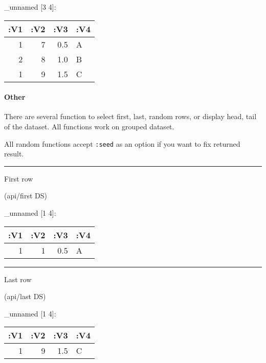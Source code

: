 \documentclass[]{article}
\newenvironment{Shaded}{\begin{snugshade}}{\end{snugshade}}
\newcommand{\NormalTok}[1]{#1}
\let\oldparagraph\paragraph
\renewcommand{\paragraph}[1]{\oldparagraph{#1}\mbox{}}
\begin{document}
\_unnamed {[}3 4{]}:

\begin{longtable}[]{@{}rrrl@{}}
\toprule
:V1 & :V2 & :V3 & :V4\tabularnewline
\midrule
\endhead
1 & 7 & 0.5 & A\tabularnewline
2 & 8 & 1.0 & B\tabularnewline
1 & 9 & 1.5 & C\tabularnewline
\bottomrule
\end{longtable}

\paragraph{Other}\label{other}

There are several function to select first, last, random rows, or
display head, tail of the dataset. All functions work on grouped
dataset.

All random functions accept \texttt{:seed} as an option if you want to
fix returned result.

\begin{center}\rule{0.5\linewidth}{0.5pt}\end{center}

First row

\begin{Shaded}
\begin{Highlighting}[]
\NormalTok{(api/first DS)}
\end{Highlighting}
\end{Shaded}

\_unnamed {[}1 4{]}:

\begin{longtable}[]{@{}rrrl@{}}
\toprule
:V1 & :V2 & :V3 & :V4\tabularnewline
\midrule
\endhead
1 & 1 & 0.5 & A\tabularnewline
\bottomrule
\end{longtable}

\begin{center}\rule{0.5\linewidth}{0.5pt}\end{center}

Last row

\begin{Shaded}
\begin{Highlighting}[]
\NormalTok{(api/last DS)}
\end{Highlighting}
\end{Shaded}

\_unnamed {[}1 4{]}:

\begin{longtable}[]{@{}rrrl@{}}
\toprule
:V1 & :V2 & :V3 & :V4\tabularnewline
\midrule
\endhead
1 & 9 & 1.5 & C\tabularnewline
\bottomrule
\end{longtable}
\end{document}
